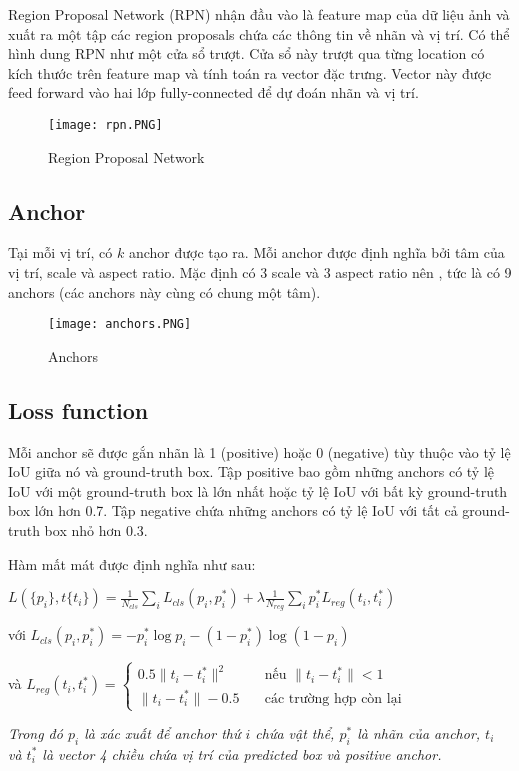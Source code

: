 \documentclass[../thesis.tex]{subfiles}
\begin{document}
Region Proposal Network (RPN) nhận đầu vào là feature map của dữ liệu ảnh và xuất ra một tập các region proposals chứa các thông tin về nhãn và vị trí. Có thể hình dung RPN như một cửa sổ trượt. Cửa sổ này trượt qua từng location có kích thước  trên feature map và tính toán ra vector đặc trưng. Vector này được feed forward vào hai lớp fully-connected để dự đoán nhãn và vị trí.

\begin{figure}[H]
	\centering
	\texttt{[image: rpn.PNG]}
	\caption{Region Proposal Network}\label{Fig:rpn}
\end{figure}

\subsection{Anchor}

Tại mỗi vị trí, có $k$ anchor được tạo ra. Mỗi anchor được định nghĩa bởi tâm của vị trí, scale và aspect ratio. Mặc định có 3 scale và 3 aspect ratio nên , tức là có 9 anchors (các anchors này cùng có chung một tâm).

\begin{figure}[H]
	\centering
	\texttt{[image: anchors.PNG]}
	\caption{Anchors}\label{Fig:anchors}
\end{figure}

\subsection{Loss function}

Mỗi anchor sẽ được gắn nhãn là 1 (positive) hoặc 0 (negative) tùy thuộc vào tỷ lệ IoU giữa nó và ground-truth box. Tập positive bao gồm những anchors có tỷ lệ IoU với một ground-truth box là lớn nhất hoặc tỷ lệ IoU với bất kỳ ground-truth box lớn hơn 0.7. Tập negative chứa những anchors có tỷ lệ IoU với tất cả ground-truth box nhỏ hơn 0.3.

Hàm mất mát được định nghĩa như sau: 

$L(\{p_i\}, t\{t_i\}) = \displaystyle\frac{1}{N_{cls}}\displaystyle\sum_{i}^{} L_{cls}(p_i, p_i^*)+\lambda\displaystyle\frac{1}{N_{reg}}\displaystyle\sum_{i}^{}p_i^*L_{reg}(t_i,t_i^*)$

với $L_{cls}(p_i, p_i^*) = -p_i^*\log{p_i} - (1 - p_i^*)\log{(1-p_i)}$

và $L_{reg}(t_i,t_i^*) = 
\begin{cases}
    0.5\|t_i - t_i^*\|^2	& \quad \text{nếu }\|t_i - t_i^*\| < 1\\
    \|t_i - t_i^*\| - 0.5  	& \quad \text{các trường hợp còn lại}
\end{cases}
$

\textit{Trong đó $p_i$ là xác xuất để anchor thứ $i$ chứa vật thể, $p^*_i$ là nhãn của anchor, $t_i$ và $t^*_i$ là vector 4 chiều chứa vị trí của predicted box và positive anchor.}
\end{document}
